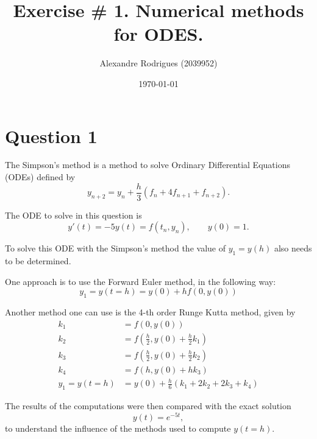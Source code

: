 \documentclass[a4paper, 11pt]{article}
\begin{document}
	
	\title{Exercise \# 1. Numerical methods for ODES. }
	\author{{\small Alexandre Rodrigues (2039952)}}
	\date{\today}
	
	\maketitle
	
		\section*{Question 1}
			
			The Simpson's method is a method to solve Ordinary Differential Equations (ODEs) defined by
			\begin{equation}
				y_{n+2} = y_n + \frac{h}{3}\left( f_n + 4 f_{n+1} + f_{n+2} \right).
			\end{equation}
	
			The ODE to solve in this question is 
			\begin{equation}
				y'(t) = -5y(t) = f(t_n,y_n),	\qquad y(0) =1.
			\end{equation}
			
			To solve this ODE with the Simpson's method the value of $ y_1 = y(h) $ also needs to be determined.
			
			One approach is to use the Forward Euler method, in the following way:
			\begin{equation}
				y_1 = y(t = h) = y(0) + h f(0,y(0))
			\end{equation}
		
			Another method one can use is the 4-th order Runge Kutta method, given by
			\begin{align}
				k_1 &= f(0,y(0)) \\
				k_2 &= f\left(\frac{h}{2},y(0) + \frac{h}{2}k_1\right) \\
				k_3 &= f\left(\frac{h}{2},y(0) + \frac{h}{2}k_2\right)\\
				k_4 &= f\left(h,y(0) + hk_3\right) \\
				y_1 = y(t = h) &= y(0) + \frac{h}{6} \left(k_1 + 2k_2 + 2k_3 + k_4 \right)
			\end{align}
					
			The results of the computations were then compared with the exact solution
			\begin{equation}
				y(t) = e^{-5t},
			\end{equation}
			to understand the influence of the methods used to compute $y(t=h)$.
			
\end{document}
